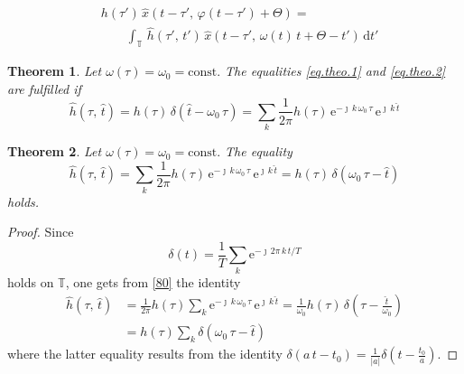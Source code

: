\documentclass[10pt,a4paper]{amsart}
\newtheorem{theorem}{Theorem}
\newcommand{\TT}{\ensuremath{\mathbb{T}}}
\newcommand{\abs}[1]{\ensuremath{\left\lvert{#1} \right\rvert}}
\newcommand{\beq}{\begin{equation}}
\newcommand{\drm}{\ensuremath{\mathrm{d}}}
\newcommand{\eeq}{ \end{equation} }
\newcommand{\htt}{\ensuremath{\hat{t}}}
\newcommand{\no}{\nonumber}
\begin{document}
	\begin{align}
	 & h(\tau')\,\hat{x}(t-\tau',\,\varphi(t-\tau')+\Theta) = \no\\
	 &\qquad \int_\TT\,
	      \hat{h}(\tau',\,t')\,\hat{x}(t-\tau',\,\omega(t)\,t+\Theta-t')\,\drm t'
	      \label{eq.theo.2}
	\end{align}

\begin{theorem}
    \label{theo.3}
    Let $\omega(\tau)=\omega_0=\text{const.}$
    The equalities \eqref{eq.theo.1} and \eqref{eq.theo.2}
    are fulfilled if
	\beq
	 \hat{h}(\tau,\,\hat{t}) = h(\tau)\,\delta(\hat{t} - \omega_0\,\tau) =
	 \sum_k \frac{1}{2 \pi} h(\tau)\, \mathrm{e}^{-\jmath \, k\, \omega_0 \,\tau}
	 \,\mathrm{e}^{\jmath \,k\, \htt} \label{80}
	\eeq
\end{theorem}

\begin{theorem}
   \label{theo.4.2}
   Let $\omega(\tau)=\omega_0=\text{const.}$  The equality
 	\beq
	 \hat{h}(\tau,\,\hat{t}) = 
	 \sum_k \frac{1}{2 \pi} h(\tau)\, \mathrm{e}^{-\jmath \,  k\, \omega_0 \,\tau}
	 \,\mathrm{e}^{\jmath \,k\, \htt} = h(\tau)\, \delta(\omega_0\,\tau - \htt) \no
	\eeq
holds.
\end{theorem}

\begin{proof}
 Since
 \[
   \delta(t) = \frac{1}{T}\sum_k \mathrm{e}^{-\jmath \, 2\pi \, k\, t/T}
 \]
 holds on $\TT$, one gets from \eqref{80} the identity
 \begin{align}
 \hat{h}(\tau,\,\hat{t}) &= 
	 \frac{1}{2 \pi} h(\tau)\sum_k  \mathrm{e}^{-\jmath \, k \,\omega_0 \, \tau}
	 \,\mathrm{e}^{\jmath \,k\, \htt} = \frac{1}{\omega_0} h(\tau)\,
	 \delta\left(\tau - \frac{\htt}{\omega_0} \right)	 \no\\
	 &= h(\tau)\sum_k \delta(\omega_0\,\tau - \htt)	 \no
 \end{align}
 where the latter equality results from the identity $\delta(a\,t - t_0) = \frac{1}{\abs{a}} 
 \delta\left(t - \frac{t_0}{a}\right)$.
\end{proof}
\end{document}
